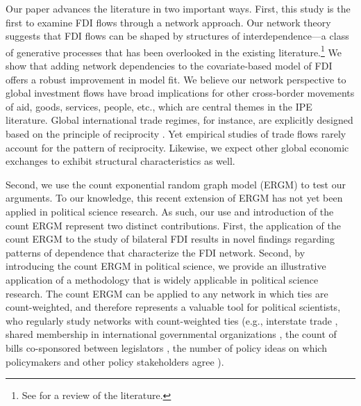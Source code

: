 \documentclass[reqno,onecolumn,letterpaper,12pt]{article}
\begin{document}
Our paper advances the literature in two important ways. First, this study is the first to examine FDI flows through a network approach. Our network theory suggests that FDI flows can be shaped by structures of interdependence---a class of generative processes that has been overlooked in the existing literature.\footnote{See \citet{Pandya:2016} for a review of the literature.} We show that adding network dependencies to the covariate-based model of FDI offers a robust improvement in model fit. %
We believe our network perspective to global investment flows have broad implications for other cross-border movements of aid, goods, services, people, etc., which are central themes in the IPE literature. Global international trade regimes, for instance, are explicitly designed based on the principle of reciprocity \citep{Bagwell_Staiger:1999}. Yet empirical studies of trade flows rarely account for the pattern of reciprocity. Likewise, we expect other global economic exchanges to exhibit structural characteristics as well.

Second, we use the count exponential random graph model (ERGM) \citep{krivitsky2012exponential} to test our arguments. To our knowledge, this recent extension of ERGM has not yet been applied in political science research. As such, our use and introduction of the count ERGM represent two distinct contributions. First, the application of the count ERGM to the study of bilateral FDI results in novel findings regarding patterns of dependence that characterize the FDI network. Second, by introducing the count ERGM in political science, we provide an illustrative application of a methodology that is widely applicable in political science research. The count ERGM can be applied to any network in which ties are count-weighted, and therefore represents a valuable tool for political scientists, who regularly study networks with count-weighted ties (e.g., interstate trade \citep{ward2007persistent}, shared membership in international governmental organizations \citep{boehmke2016addressing}, the count of bills co-sponsored between legislators \citep{kirkland2013hypothesis}, the number of policy ideas on which policymakers and other policy stakeholders agree \citep{leifeld2013reconceptualizing}).

\end{document}
